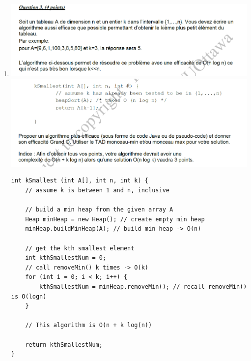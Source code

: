 \documentclass[12pt]{book}
\begin{document}
\begin{enumerate}
    \item 
    
    \includegraphics[scale=0.5]{q3question.png}\\
    \includegraphics[scale=0.5]{q3question2.png}\\
    
    \begin{verbatim}
int kSmallest (int A[], int n, int k) {
    // assume k is between 1 and n, inclusive
    
    // build a min heap from the given array A
    Heap minHeap = new Heap(); // create empty min heap
    minHeap.buildMinHeap(A); // build min heap -> O(n)
    
    // get the kth smallest element
    int kthSmallestNum = 0;
    // call removeMin() k times -> O(k)
    for (int i = 0; i < k; i++) {
        kthSmallestNum = minHeap.removeMin(); // recall removeMin() is O(logn)
    }
    
    // This algorithm is O(n + k log(n))
    
    return kthSmallestNum;
}
        \end{verbatim}
    
    
\end{enumerate}
\end{document}
